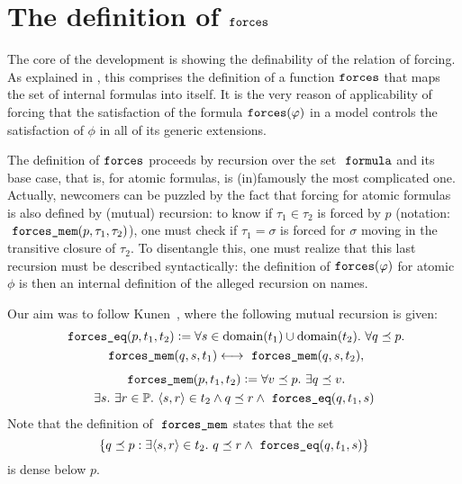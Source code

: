\section{The definition of $\mathop{\mathtt{forces}}$}
\label{sec:definition-forces}

The core of the development is showing the definability of the
relation of forcing. As explained in
\cite[Sect.~8]{2019arXiv190103313G}, this comprises the 
definition of a function $\mathop{\mathtt{forces}}$ that maps the set of internal
formulas into itself. It is the very reason of applicability of
forcing that the satisfaction of the formula $\mathop{\mathtt{forces}}(\varphi)$ in a
model controls the satisfaction of $\phi$ in all of its generic
extensions.

The definition of $\mathop{\mathtt{forces}}$ proceeds by recursion
over the set $\formula$ and its base case, that is, for
atomic formulas, is (in)famously the most complicated one. Actually,
newcomers can be puzzled by the fact that forcing for atomic
formulas is also defined by (mutual) recursion: to know if $\tau_1\in\tau_2$ is
forced by $p$ (notation: $\forcesmem(p,\tau_1,\tau_2)$), one must check if $\tau_1=\sigma$ is forced for $\sigma$
moving in the transitive closure of $\tau_2$. To disentangle this, one
must realize that this last recursion must be described syntactically:
the definition of $\mathop{\mathtt{forces}}(\varphi)$ for atomic $\phi$ is then an
internal definition of the alleged recursion on names. 

Our aim was to follow Kunen~\cite[p.~257]{kunen2011set}, where the
following mutual recursion is given:
\begin{multline}\label{eq:def-forcing-equality}
  \forceseq (p,t_1,t_2) \defi 
  \forall s\in\dom(t_1)\cup\dom(t_2).\ \forall q\pleq p .\\
  \forcesmem(q,s,t_1)\lsii 
  \forcesmem(q,s,t_2),
\end{multline}
\begin{multline}\label{eq:def-forcing-membership}
  \forcesmem(p,t_1,t_2) \defi  \forall v\pleq p. \ \exists q\pleq v. \\
  \exists s.\ \exists r\in \PP .\ \lb s,r\rb \in
      t_2 \land q \pleq r \land \forceseq(q,t_1,s)
\end{multline}
Note that the definition of $\forcesmem$ states that the set 
\[
\{q\pleq p : \exists \lb s,r\rb\in t_2 . \ q\pleq r \land \forceseq(q,t_1,s)\}
\]
is dense below $p$.

